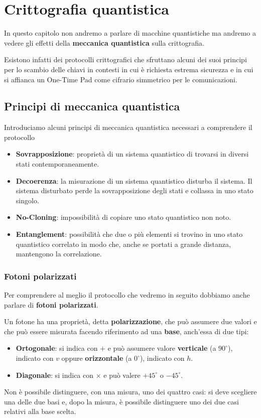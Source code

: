 \chapter{Crittografia quantistica}
In questo capitolo non andremo a parlare di macchine quantistiche ma andremo a vedere gli effetti della
\textbf{meccanica quantistica} sulla crittografia.

Esistono infatti dei protocolli crittografici che sfruttano alcuni dei suoi principi per lo scambio delle chiavi in
contesti in cui \`e richiesta estrema sicurezza e in cui si affianca un One-Time Pad come cifrario simmetrico per
le comunicazioni.

\section{Principi di meccanica quantistica}
Introduciamo alcuni principi di meccanica quantistica necessari a comprendere il protocollo
\begin{itemize}
	\item \textbf{Sovrapposizione}: propriet\`a di un sistema quantistico di trovarsi in diversi stati
	      contemporaneamente.
	\item \textbf{Decoerenza}: la misurazione di un sistema quantistico disturba il sistema. Il sistema disturbato
	      perde la sovrapposizione degli stati e collassa in uno stato singolo.
	\item \textbf{No-Cloning}: impossibilit\`a di copiare uno stato quantistico non noto.
	\item \textbf{Entanglement}: possibilit\`a che due o pi\`u elementi si trovino in uno stato quantistico correlato
	      in modo che, anche se portati a grande distanza, mantengono la correlazione.
\end{itemize}

\subsection{Fotoni polarizzati}
Per comprendere al meglio il protocollo che vedremo in seguito dobbiamo anche parlare di \textbf{fotoni polarizzati}.

Un fotone ha una propriet\`a, detta \textbf{polarizzazione}, che pu\`o assumere due valori e che pu\`o essere misurata
facendo riferimento ad una \textbf{base}, anch'essa di due tipi:
\begin{itemize}
	\item \textbf{Ortogonale}: si indica con $+$ e pu\`o assumere valore \textbf{verticale} (a $90^\circ$), indicato con
	      $v$ oppure \textbf{orizzontale} (a $0^\circ$), indicato con $h$.
	\item \textbf{Diagonale}: si indica con $\times$ e pu\`o valere $+45^\circ$ o $-45^\circ$.
\end{itemize}
Non \`e possibile distinguere, con una misura, uno dei quattro casi: si deve scegliere una delle due basi e, dopo la
misura, \`e possibile distinguere uno dei due casi relativi alla base scelta.

